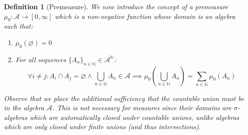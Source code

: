 \documentclass[10pt,letterpaper]{article} %
\newtheorem{defn}{Definition}[section]
\begin{document}
\begin{defn}[Premeasure]
We now introduce the concept of a premeasure $\mu_0: \mathcal{A} \xrightarrow{} [0, \infty]$ which is a non-negative function whose domain is an algebra such that:
\begin{enumerate}
\item $\mu_0(\varnothing) = 0$
\item For all sequences $\{A_n\}_{n \in \mathbb{N}} \in \mathcal{A}^\mathbb{N}$:
\begin{equation*}
\forall i \neq j: A_i \cap A_j = \varnothing \land \bigcup_{n \in \mathbb{N}}A_n \in \mathcal{A} \implies \mu_0\left(\bigcup_{n \in \mathbb{N}}A_n\right) = \sum_{n \in \mathbb{N}}\mu_0(A_n)
\end{equation*}
\end{enumerate}
Observe that we place the additional sufficiency that the countable union must be in the algebra $\mathcal{A}$. This is not necessary for measures since their domains are $\sigma$-algebras which are automatically closed under countable unions,
unlike algebras which are only closed under finite unions (and thus intersections).
\end{defn}
\end{document}
